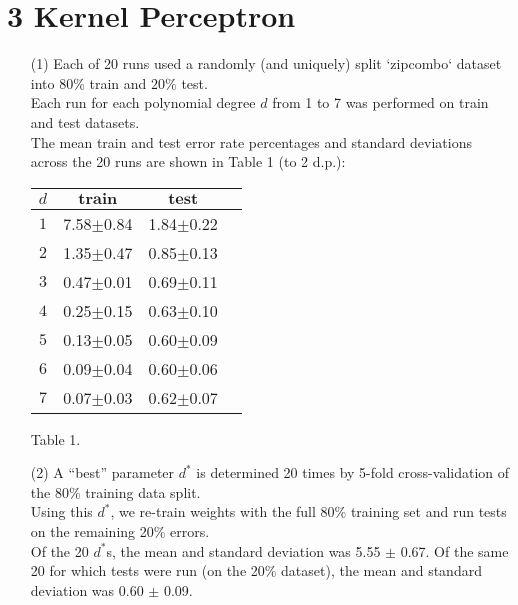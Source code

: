 \documentclass[a4paper,12pt]{article}
\begin{document}
\section*{3 Kernel Perceptron}
\begin{enumerate}

\item[(1)] 
Each of 20 runs used a randomly (and uniquely) split `zipcombo` dataset into $80\%$ train and $20\%$ test. \\
Each run for each polynomial degree $d$ from 1 to 7 was performed on train and test datasets.\\
The mean train and test error rate percentages and standard deviations across the 20 runs are shown in Table 1 (to 2 d.p.):

\begin{tabular}{|c|c|c|c|}
\hline
$d$&$\textbf{train}$&$\textbf{test}$\\
\hline
$1$&7.58$\pm$0.84&1.84$\pm$0.22\\
\hline
$2$&1.35$\pm$0.47&0.85$\pm$0.13\\
\hline
$3$&0.47$\pm$0.01&0.69$\pm$0.11\\
\hline
$4$&0.25$\pm$0.15&0.63$\pm$0.10\\
\hline
$5$&0.13$\pm$0.05&0.60$\pm$0.09\\
\hline
$6$&0.09$\pm$0.04&0.60$\pm$0.06\\
\hline
$7$&0.07$\pm$0.03&0.62$\pm$0.07\\
\hline
\end{tabular}\par 
Table 1.

\item[(2)] 
A “best” parameter $d^*$ is determined 20 times by 5-fold cross-validation of the $80\%$ training data split. \\
Using this $d^*$, we re-train weights with the full $80\%$ training set and run tests on the remaining 20\% errors. \\
Of the 20 $d^*$s, the mean and standard deviation was 5.55 $\pm$ 0.67.
Of the same 20 for which tests were run (on the 20\% dataset), the mean and standard deviation was 0.60 $\pm$ 0.09.

\end{enumerate}
\clearpage
\end{document}
